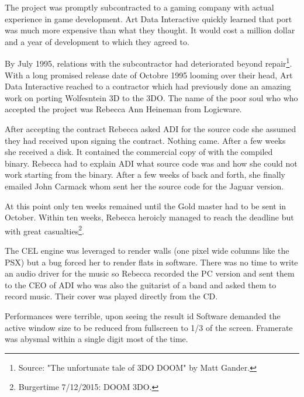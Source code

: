 The project was promptly subcontracted to a gaming company with actual experience in game development. Art Data Interactive quickly learned that port was much more expensive than what they thought. It would cost a million dollar and a year of development to which they agreed to.\\
\par
By July 1995, relations with the subcontractor had deteriorated beyond repair\footnote{Source: "The unfortunate tale of 3DO DOOM" by Matt Gander.}. With a long promised release date of Octobre 1995 looming over their head, Art Data Interactive reached to a contractor which had previously done an amazing work on porting Wolfesntein 3D to the 3DO. The name of the poor soul who who accepted the project was Rebecca Ann Heineman from Logicware.\\
\par
After accepting the contract Rebecca asked ADI for the source code she assumed they had received upon signing the contract. Nothing came. After a few weeks she received a disk. It contained the commercial copy of \doom with the compiled binary. Rebecca had to explain ADI what source code was and how she could not work starting from the binary. After a few weeks of back and forth, she finally emailed John Carmack whom sent her the source code for the Jaguar version.\\
\par
 At this point only ten weeks remained until the Gold master had to be sent in October. Within ten weeks, Rebecca heroicly managed to reach the deadline but with great casualties\footnote{Burgertime 7/12/2015: DOOM 3DO.}.\\
\par
{}
\par
The CEL engine was leveraged to render walls (one pixel wide columns like the PSX) but a bug forced her to render flats in software. There was no time to write an audio driver for the music so Rebecca recorded the PC version and sent them to the CEO of ADI who was also the guitarist of a band and asked them to record music. Their cover was played directly from the CD.\\ 
\par
 Performances were terrible, upon seeing the result id Software demanded the active window size to be reduced from fullscreen to 1/3 of the screen. Framerate was abysmal within a single digit most of the time.\\
\par
